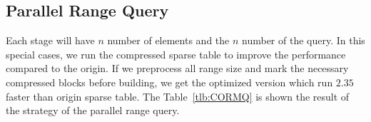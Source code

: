 \iffalse 當運行 $n > 10^6$ 時，我們提出的壓縮稀疏表的效能已經勝過并查
集的版本，其運行結果如圖表 ~\ref{fig:fig-ISMQcmp}。在 $n = 10^7$ 時，
加速 $1.25 \times$。然而，我們提供的 amortized $\theta(1)$ 的稀疏表慢
於并查集，我們做了深入的機率探討 (參照表 ~\ref{tlb:ISMQcmp})，由於大部
分的操作都被區塊後綴和前綴解決，沒有實際運用到內部詢問，約束區間詢問的
大小為 $L$，在 $N = 10^7$ 時，最多能加速 $1.26 \times$，其中插入和詢問
比例為 1:10，當詢問比重更大時，將有更明顯的加速。\fi



\subsection{Parallel Range Query}

Each stage will have $n$ number of elements and the $n$ number of the
query.  In this special cases, we run the compressed sparse table to
improve the performance compared to the origin.  If we preprocess all
range size and mark the necessary compressed blocks before building, we
get the optimized version which run $2.35$ faster than origin sparse
table. The Table~\ref{tlb:CORMQ} is shown the result of the strategy of
the parallel range query.

\iffalse 每一次有 $n$ 個元素和 $n$ 組詢問，針對這種特殊性質的問題，我
們運行樸素的 \texttt{CORMQ} (compressed RMQ) 得到效能改善，搭配可預測
的分析降低運算量 (參照 \texttt{CORMQ-opt})，得到更好的改善。在
\texttt{CORMQ-opt} 策略中，得到 $2.35 \times$ 倍的加速，結果如表
~\ref{tlb:CORMQ}。\fi


